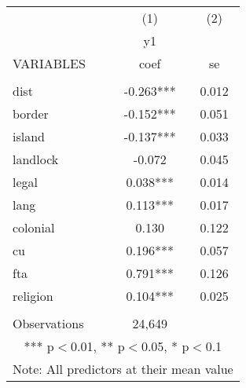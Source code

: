 \documentclass[]{article}
\begin{document}
\begin{tabular}{lcc} \hline
 & (1) & (2) \\
 & y1 &  \\
VARIABLES & coef & se \\ \hline
 &  &  \\
dist & -0.263*** & 0.012 \\
border & -0.152*** & 0.051 \\
island & -0.137*** & 0.033 \\
landlock & -0.072 & 0.045 \\
legal & 0.038*** & 0.014 \\
lang & 0.113*** & 0.017 \\
colonial & 0.130 & 0.122 \\
cu & 0.196*** & 0.057 \\
fta & 0.791*** & 0.126 \\
religion & 0.104*** & 0.025 \\
 &  &  \\
 Observations & 24,649 &  \\ \hline
\multicolumn{3}{c}{ *** p$<$0.01, ** p$<$0.05, * p$<$0.1} \\
\multicolumn{3}{c}{ Note: All predictors at their mean value} \\
\end{tabular}
\end{document}
